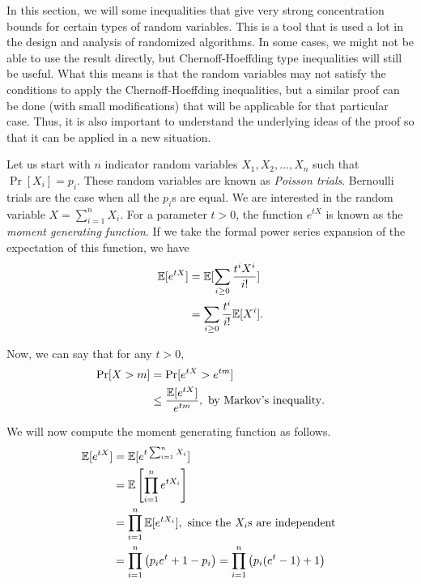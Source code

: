 In this section, we will some inequalities that give very strong concentration bounds for certain types of random variables. This is a tool that is used a lot in the design and analysis of randomized algorithms. In some cases, we might not be able to use the result directly, but Chernoff-Hoeffding type inequalities will still be useful. What this means is that the random variables may not satisfy the conditions to apply the Chernoff-Hoeffding inequalities, but a similar proof can be done (with small modifications) that will be applicable for that particular case. Thus, it is also important to understand the underlying ideas of the proof so that it can be applied in a new situation. 

Let us start with $n$ indicator random variables $X_1, X_2, \ldots, X_n$ such that $\Pr[X_i]=p_i$. These random variables are known as \emph{Poisson trials}. Bernoulli trials are the case when all the $p_i$s are equal. We are interested in the random variable $X = \sum_{i=1}^n X_i$. For a parameter $t>0$, the function $e^{tX}$ is known as the \emph{moment generating function}. If we take the formal power series expansion of the expectation of this function, we have
\begin{align*}
	\mathbb{E}[e^{tX}] &= \mathbb{E}[\sum_{i \geq 0} \frac{t^i X^i}{i!}]\\
	&= \sum_{i\geq 0} \frac{t^i}{i!} \mathbb{E}[X^i].
\end{align*} 

Now, we can say that for any $t>0$,
\begin{align*}
	\Pr[X > m] &= \Pr[e^{tX} > e^{tm}]\\
	&\leq \frac{\mathbb{E}[e^{tX}]}{e^{tm}}, \text{ by Markov's inequality}.
\end{align*}

We will now compute the moment generating function as follows.
\begin{align*}
	\mathbb{E}[e^{tX}] &= \mathbb{E}[e^{t\sum_{i=1}^n X_i}]\\
	&= \mathbb{E}\left[ \prod_{i=1}^n e^{tX_i} \right]\\
	&= \prod_{i=1}^n \mathbb{E}[e^{tX_i}], \text{ since the $X_i$s are independent }\\
	&= \prod_{i=1}^n\left( p_ie^t + 1 - p_i \right) = \prod_{i=1}^n\left( p_i(e^t -1) + 1 \right)
\end{align*}

